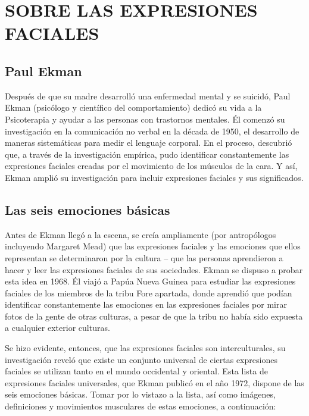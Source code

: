 \section{SOBRE LAS EXPRESIONES FACIALES}
\subsection{Paul Ekman}

Después de que su madre desarrolló una enfermedad mental y se suicidó, Paul
Ekman (psicólogo y científico del comportamiento) dedicó su vida a la Psicoterapia y
ayudar a las personas con trastornos mentales. Él comenzó su investigación en la
comunicación no verbal en la década de 1950, el desarrollo de maneras sistemáticas para
medir el lenguaje corporal. En el proceso, descubrió que, a través de la investigación
empírica, pudo identificar constantemente las expresiones faciales creadas por el
movimiento de los músculos de la cara. Y así, Ekman amplió su investigación para incluir
expresiones faciales y sus significados\cite{29ekman2016scientists}.


\subsection{Las seis emociones básicas}
Antes de Ekman llegó a la escena, se creía ampliamente (por antropólogos
incluyendo Margaret Mead) que las expresiones faciales y las emociones que ellos
representan se determinaron por la cultura – que las personas aprendieron a hacer y leer
las expresiones faciales de sus sociedades. Ekman se dispuso a probar esta idea en
1968. Él viajó a Papúa Nueva Guinea para estudiar las expresiones faciales de los
miembros de la tribu Fore apartada, donde aprendió que podían identificar
constantemente las emociones en las expresiones faciales por mirar fotos de la gente de
otras culturas, a pesar de que la tribu no había sido expuesta a cualquier exterior culturas.

Se hizo evidente, entonces, que las expresiones faciales son interculturales, su
investigación reveló que existe un conjunto universal de ciertas expresiones faciales se
utilizan tanto en el mundo occidental y oriental. Esta lista de expresiones faciales
universales, que Ekman publicó en el año 1972, dispone de las seis emociones
básicas. Tomar por lo vistazo a la lista, así como imágenes, definiciones y movimientos
musculares de estas emociones, a continuación:

